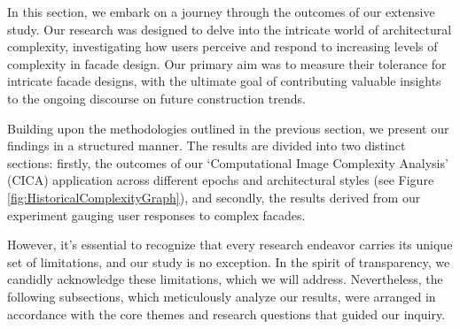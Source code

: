 %



In this section, we embark on a journey through the outcomes of our extensive study.
Our research was designed to delve into the intricate world of architectural complexity, investigating how users perceive and respond to increasing levels of complexity in facade design.
Our primary aim was to measure their tolerance for intricate facade designs, with the ultimate goal of contributing valuable insights to the ongoing discourse on future construction trends.

Building upon the methodologies outlined in the previous section, we present our findings in a structured manner.
The results are divided into two distinct sections: firstly, the outcomes of our `Computational Image Complexity Analysis' (CICA) application across different epochs and architectural styles (see Figure \ref{fig:HistoricalComplexityGraph}), and secondly, the results derived from our experiment gauging user responses to complex facades.

However, it's essential to recognize that every research endeavor carries its unique set of limitations, and our study is no exception.
In the spirit of transparency, we candidly acknowledge these limitations, which we will address.
Nevertheless, the following subsections, which meticulously analyze our results, were arranged in accordance with the core themes and research questions that guided our inquiry.



